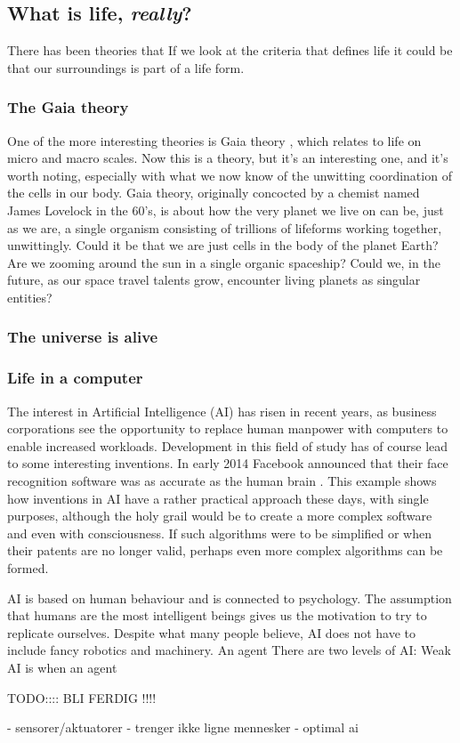 \subsection*{What is life, \textit{really}?}

There has been theories that 
If we look at the criteria that defines life it could be that our surroundings is part of a life form.

\subsubsection{The Gaia theory}
One of the more interesting theories is Gaia theory \cite{Lovelock}, which relates to life on micro and macro scales. Now this is a theory, but it's an interesting one, and it's worth noting, especially with what we now know of the unwitting coordination of the cells in our body.
Gaia theory, originally concocted by a chemist named James Lovelock in the 60's, is about how the very planet we live on can be, just as we are, a single organism consisting of trillions of lifeforms working together, unwittingly.
Could it be that we are just cells in the body of the planet Earth?
Are we zooming around the sun in a single organic spaceship?
Could we, in the future, as our space travel talents grow, encounter living planets as singular entities?

\subsubsection{The universe is alive}

\subsubsection{Life in a computer}
The interest in Artificial Intelligence (AI) has risen in recent years, as business corporations see the opportunity to replace human manpower with computers to enable increased workloads.
Development in this field of study has of course lead to some interesting inventions.
In early 2014 Facebook announced that their face recognition software was as accurate as the human brain \cite{facebook}.
This example shows how inventions in AI have a rather practical approach these days, with single purposes, although the holy grail would be to create a more complex software and even with consciousness.
If such algorithms were to be simplified or when their patents are no longer valid, perhaps even more complex algorithms can be formed.

AI is based on human behaviour and is connected to psychology.
The assumption that humans are the most intelligent beings gives us the motivation to try to replicate ourselves.
Despite what many people believe, AI does not have to include fancy robotics and machinery.
An agent 
There are two levels of AI: Weak AI is when an agent 


TODO:::: BLI FERDIG !!!!

- sensorer/aktuatorer
- trenger ikke ligne mennesker
- optimal ai